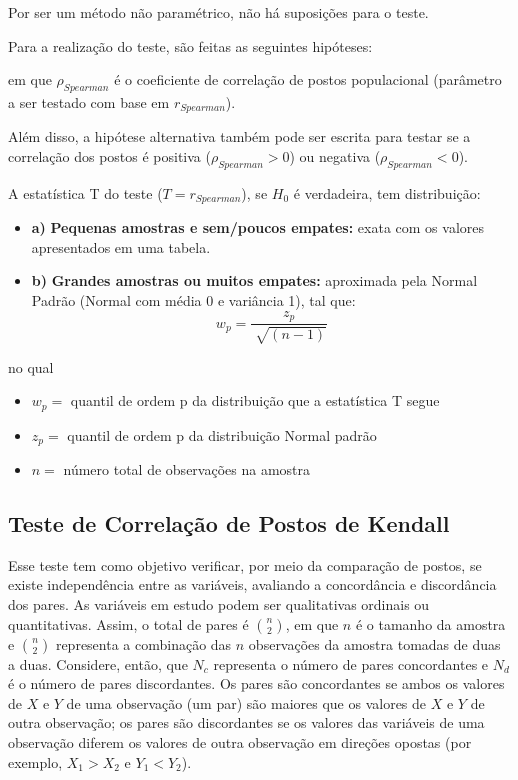 \documentclass[
]{estat/estat}
\providecommand{\tightlist}{%
  \setlength{\itemsep}{0pt}\setlength{\parskip}{0pt}}\usepackage{longtable,booktabs,array}
\begin{document}
Por ser um método não paramétrico, não há suposições para o teste.

Para a realização do teste, são feitas as seguintes hipóteses:


em que \(\rho_{Spearman}\) é o coeficiente de correlação de postos
populacional (parâmetro a ser testado com base em \(r_{Spearman}\)).

Além disso, a hipótese alternativa também pode ser escrita para testar
se a correlação dos postos é positiva (\(\rho_{Spearman} > 0\)) ou
negativa (\(\rho_{Spearman} < 0\)).

A estatística T do teste (\(T=r_{Spearman}\)), se \(H_0\) é verdadeira,
tem distribuição:

\begin{itemize}
\tightlist
\item
  \textbf{a)} \textbf{Pequenas amostras e sem/poucos empates:} exata com
  os valores apresentados em uma tabela.
\item
  \textbf{b)} \textbf{Grandes amostras ou muitos empates:} aproximada
  pela Normal Padrão (Normal com média 0 e variância 1), tal que: \[
  w_p = \frac{z_p}{\sqrt[]{(n-1)}}
  \]
\end{itemize}

no qual

\begin{itemize}
\tightlist
\item
  \(w_p=\) quantil de ordem p da distribuição que a estatística T segue
\item
  \(z_p=\) quantil de ordem p da distribuição Normal padrão
\item
  \(n=\) número total de observações na amostra
\end{itemize}

\hypertarget{teste-de-correlauxe7uxe3o-de-postos-de-kendall}{%
\subsection{Teste de Correlação de Postos de
Kendall}\label{teste-de-correlauxe7uxe3o-de-postos-de-kendall}}

Esse teste tem como objetivo verificar, por meio da comparação de
postos, se existe independência entre as variáveis, avaliando a
concordância e discordância dos pares. As variáveis em estudo podem ser
qualitativas ordinais ou quantitativas. Assim, o total de pares é
\(\binom{n}{2}\), em que \(n\) é o tamanho da amostra e \(\binom{n}{2}\)
representa a combinação das \(n\) observações da amostra tomadas de duas
a duas. Considere, então, que \(N_{c}\) representa o número de pares
concordantes e \(N_{d}\) é o número de pares discordantes. Os pares são
concordantes se ambos os valores de \(X\) e \(Y\) de uma observação (um
par) são maiores que os valores de \(X\) e \(Y\) de outra observação; os
pares são discordantes se os valores das variáveis de uma observação
diferem os valores de outra observação em direções opostas (por exemplo,
\(X_{1} > X_{2}\) e \(Y_{1} < Y_{2}\)).
\end{document}
